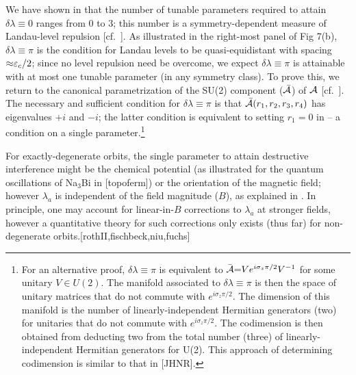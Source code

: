 \documentclass[aps, prb, showpacs, twocolumn, notitlepage, superscriptaddress]{revtex4-1}
\begin{document}

We have shown in  that  the number of tunable parameters required to attain  $\delta \lambda{\equiv}0$ ranges from $0$ to $3$; this number is a symmetry-dependent measure of Landau-level repulsion [cf.\ ]. As illustrated in the right-most panel of Fig 7(b), $\delta \lambda{\equiv}\pi$ is the condition  for Landau levels to be quasi-equidistant  with spacing ${\approx}\varepsilon_c/2$; since no level repulsion need be overcome,
we expect $\delta \lambda{\equiv}\pi$ is attainable with at most one tunable parameter (in any symmetry class). To prove this, we return to the canonical parametrization of the SU(2) component (${\cal \bar{A}}$) of ${\cal A}$ [cf.\ ]. The necessary and sufficient condition for $\delta \lambda{\equiv}\pi$ is that ${\cal \bar{A}}(r_1,r_2,r_3,r_4)$ has eigenvalues $+i$ and $-i$; the latter condition is equivalent to setting $r_1{=}0$ in  -- a condition on a single parameter.\footnote{For an alternative proof,   $\delta \lambda{\equiv}\pi$ is equivalent to ${ \bar{\cal A}}{=}Ve^{i\sigma_z\pi/2}V^{-1}$ for some unitary $V\in U(2)$. The manifold associated to $\delta \lambda{\equiv}\pi$ is then the space of unitary matrices  that do not commute with $e^{i\sigma_z\pi/2}$.  The dimension of this manifold is the number of linearly-independent Hermitian generators (two) for unitaries that do not commute with $e^{i\sigma_z\pi/2}$. The codimension is then obtained from deducting two from the total number (three)  of linearly-independent Hermitian generators  for U(2). This approach of determining codimension is similar to that in [JHNR].} 

For exactly-degenerate orbits, the single parameter to attain destructive interference might be the chemical potential (as illustrated for the quantum oscillations of Na$_3$Bi in [topoferm]) or the orientation of the magnetic field; however $\lambda_a$ is independent of the field magnitude ($B$), as explained in . In principle, one may account for linear-in-$B$ corrections to $\lambda_a$ at stronger fields, however a quantitative theory for such corrections only exists (thus far) for non-degenerate orbits.[rothII,fischbeck,niu,fuchs] 
\end{document}
